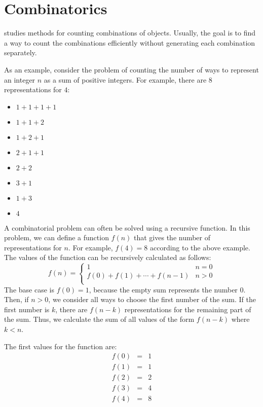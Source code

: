 \chapter{Combinatorics}


 studies methods for counting
combinations of objects.
Usually, the goal is to find a way to
count the combinations efficiently
without generating each combination separately.

As an example, consider the problem
of counting the number of ways to
represent an integer $n$ as a sum of positive integers.
For example, there are 8 representations
for $4$:
\begin{multicols}{2}
\begin{itemize}
\item $1+1+1+1$
\item $1+1+2$
\item $1+2+1$
\item $2+1+1$
\item $2+2$
\item $3+1$
\item $1+3$
\item $4$
\end{itemize}
\end{multicols}

A combinatorial problem can often be solved
using a recursive function.
In this problem, we can define a function $f(n)$
that gives the number of representations for $n$.
For example, $f(4)=8$ according to the above example.
The values of the function
can be recursively calculated as follows:
\begin{equation*}
    f(n) = \begin{cases}
               1               & n = 0\\
               f(0)+f(1)+\cdots+f(n-1) & n > 0\\
           \end{cases}
\end{equation*}
The base case is $f(0)=1$,
because the empty sum represents the number 0.
Then, if $n>0$, we consider all ways to
choose the first number of the sum.
If the first number is $k$,
there are $f(n-k)$ representations
for the remaining part of the sum.
Thus, we calculate the sum of all values
of the form $f(n-k)$ where $k<n$.

The first values for the function are:
\[
\begin{array}{lcl}
f(0) & = & 1 \\
f(1) & = & 1 \\
f(2) & = & 2 \\
f(3) & = & 4 \\
f(4) & = & 8 \\
\end{array}
\]

